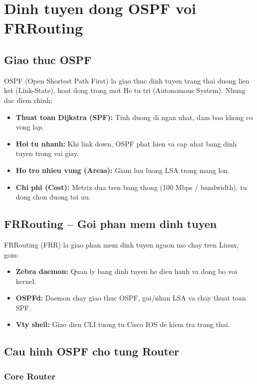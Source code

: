 \chapter{Dinh tuyen dong OSPF voi FRRouting}

\section{Giao thuc OSPF}

OSPF (Open Shortest Path First) la giao thuc dinh tuyen trang thai duong lien ket (Link-State), hoat dong trong mot He tu tri (Autonomous System). Nhung dac diem chinh:

\begin{itemize}
    \item \textbf{Thuat toan Dijkstra (SPF):} Tinh duong di ngan nhat, dam bao khong co vong lap.
    \item \textbf{Hoi tu nhanh:} Khi link down, OSPF phat hien va cap nhat bang dinh tuyen trong vai giay.
    \item \textbf{Ho tro nhieu vung (Areas):} Giam luu luong LSA trong mang lon.
    \item \textbf{Chi phi (Cost):} Metrix dua tren bang thong (100 Mbps / bandwidth), tu dong chon duong toi uu.
\end{itemize}

\section{FRRouting -- Goi phan mem dinh tuyen}

FRRouting (FRR) la giao phan mem dinh tuyen nguon mo chay tren Linux, gom:

\begin{itemize}
    \item \textbf{Zebra daemon:} Quan ly bang dinh tuyen he dieu hanh va dong bo voi kernel.
    \item \textbf{OSPFd:} Daemon chay giao thuc OSPF, gui/nhan LSA va chay thuat toan SPF.
    \item \textbf{Vty shell:} Giao dien CLI tuong tu Cisco IOS de kiem tra trang thai.
\end{itemize}

\section{Cau hinh OSPF cho tung Router}

\subsection{Core Router}

